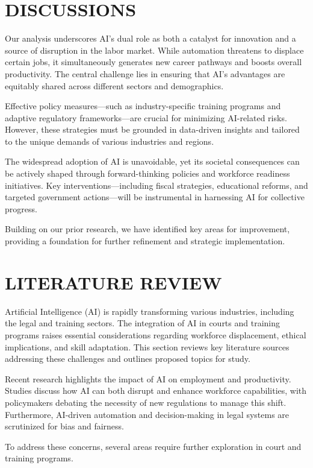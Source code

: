 \documentclass[a4paper,headinclude=on,footinclude=on,12pt,oneside]{scrbook}
\begin{document}
\section*{DISCUSSIONS}

Our analysis underscores AI’s dual role as both a catalyst for innovation and a source of disruption in the labor market. While automation threatens to displace certain jobs, it simultaneously generates new career pathways and boosts overall productivity. The central challenge lies in ensuring that AI’s advantages are equitably shared across different sectors and demographics.

Effective policy measures—such as industry-specific training programs and adaptive regulatory frameworks—are crucial for minimizing AI-related risks. However, these strategies must be grounded in data-driven insights and tailored to the unique demands of various industries and regions.

The widespread adoption of AI is unavoidable, yet its societal consequences can be actively shaped through forward-thinking policies and workforce readiness initiatives. Key interventions—including fiscal strategies, educational reforms, and targeted government actions—will be instrumental in harnessing AI for collective progress.

Building on our prior research, we have identified key areas for improvement, providing a foundation for further refinement and strategic implementation.

\section*{LITERATURE REVIEW}

Artificial Intelligence (AI) is rapidly transforming various industries, including the legal and training sectors. The integration of AI in courts and training programs raises essential considerations regarding workforce displacement, ethical implications, and skill adaptation. This section reviews key literature sources addressing these challenges and outlines proposed topics for study.

Recent research highlights the impact of AI on employment and productivity. Studies discuss how AI can both disrupt and enhance workforce capabilities, with policymakers debating the necessity of new regulations to manage this shift. Furthermore, AI-driven automation and decision-making in legal systems are scrutinized for bias and fairness.

To address these concerns, several areas require further exploration in court and training programs.
\end{document}
